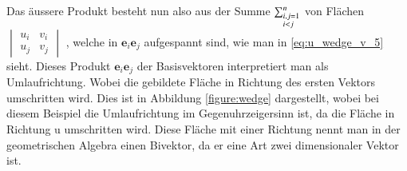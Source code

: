 Das äussere Produkt besteht nun also aus der Summe 
    \(\sum_{\begin{subarray}{l}i,j=1\\i < j\end{subarray}}^n\)
    von Flächen 
    \(\begin{vmatrix} 
    	u_i & v_i \\
    	u_j & v_j
    \end{vmatrix}\)
, welche in $\textbf{e}_i\textbf{e}_j$ aufgespannt sind, wie man in \ref{eq:u_wedge_v_5} sieht. 
Dieses Produkt $\textbf{e}_i\textbf{e}_j$ der Basisvektoren interpretiert man als Umlaufrichtung.
Wobei die gebildete Fläche in Richtung des ersten Vektors umschritten wird. 
Dies ist in Abbildung \ref{figure:wedge} dargestellt, wobei bei diesem Beispiel die Umlaufrichtung im Gegenuhrzeigersinn ist, da die Fläche in Richtung u umschritten wird. 
Diese Fläche mit einer Richtung nennt man in der geometrischen Algebra einen Bivektor, da er eine Art zwei dimensionaler Vektor ist. 
